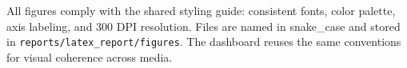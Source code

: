 All figures comply with the shared styling guide: consistent fonts, color palette, axis labeling, and 300 DPI resolution. Files are named in snake\_case and stored in \texttt{reports/latex\_report/figures}. The dashboard reuses the same conventions for visual coherence across media.
